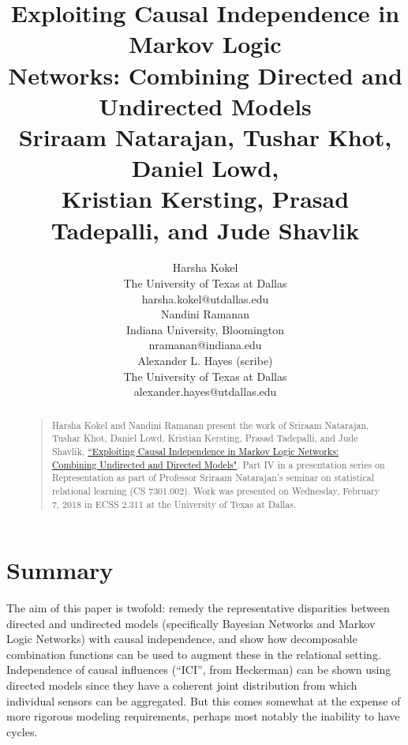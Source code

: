 \documentclass[letterpaper]{article}
\begin{document}
%
\title{Exploiting Causal Independence in Markov Logic\\Networks: Combining Directed and Undirected Models\\
\large Sriraam Natarajan, Tushar Khot, Daniel Lowd,\\Kristian Kersting, Prasad Tadepalli, and Jude Shavlik
}
\author{Harsha Kokel\\
The University of Texas at Dallas\\
harsha.kokel@utdallas.edu\\
\And
Nandini Ramanan\\
Indiana University, Bloomington\\
nramanan@indiana.edu\\
\And
Alexander L. Hayes (scribe)\\
The University of Texas at Dallas\\
alexander.hayes@utdallas.edu
}

\maketitle
\begin{abstract}
\begin{quote}
Harsha Kokel and Nandini Ramanan present the work of Sriraam Natarajan, Tushar Khot, Daniel Lowd, Kristian Kersting, Prasad Tadepalli, and Jude Shavlik, \href{http://homes.soic.indiana.edu/natarasr/Papers/Natarajan.ECML10.pdf}{``Exploiting Causal Independence in Markov Logic Networks: Combining Undirected and Directed Models"}. Part IV in a presentation series on Representation as part of Professor Sriraam Natarajan's seminar on statistical relational learning (CS 7301.002). Work was presented on Wednesday, February 7, 2018 in ECSS 2.311 at the University of Texas at Dallas.
\end{quote}
\end{abstract}

\section{Summary}

The aim of this paper is twofold: remedy the representative disparities between directed and undirected models (specifically Bayesian Networks and Markov Logic Networks) with causal independence, and show how decomposable combination functions can be used to augment these in the relational setting. Independence  of causal influences (``ICI'', from Heckerman) can be shown using directed models since they have a coherent joint distribution from which individual sensors can be aggregated. But this comes somewhat at the expense of more rigorous modeling requirements, perhaps most notably the inability to have cycles.
\end{document}

